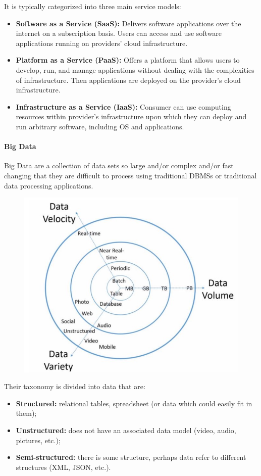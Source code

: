 It is typically categorized into three main service models:
\begin{itemize}
    \item \textbf{Software as a Service (SaaS):} Delivers software applications over the internet on a subscription basis. Users can access and use software applications running on providers' cloud infrastructure.
    \item \textbf{Platform as a Service (PaaS):} Offers a platform that allows users to develop, run, and manage applications without dealing with the complexities of infrastructure. Then applications are deployed on the provider's cloud infrastructure.
    \item \textbf{Infrastructure as a Service (IaaS):} Consumer can use computing resources within provider’s infrastructure upon which they can deploy and run arbitrary software, including OS and applications.
\end{itemize}

\paragraph{Big Data}
Big Data are a collection of data sets so large and/or complex and/or fast changing that they are difficult to process using traditional DBMSs or traditional data processing applications.
\begin{figure}[ht!]
    \centering
    \includegraphics[scale=0.7]{images/BigData_definition.jpg}
\end{figure}

Their taxonomy is divided into data that are:
\begin{itemize}
    \item \textbf{Structured:} relational tables, spreadsheet (or data which could easily fit in them);
    \item \textbf{Unstructured:} does not have an associated data model (video, audio, pictures, etc.);
    \item \textbf{Semi-structured:} there is some structure, perhaps data refer to different structures (XML, JSON, etc.).
\end{itemize}
